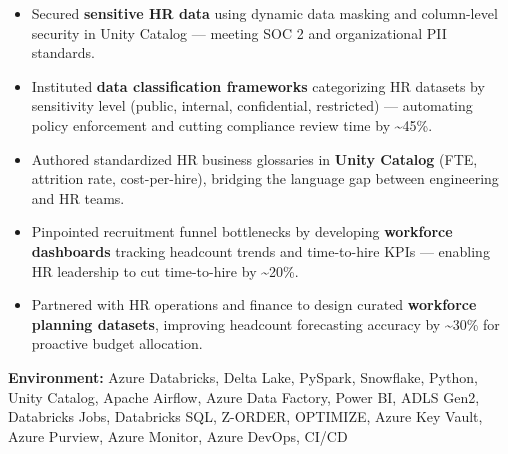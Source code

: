 \documentclass[a4paper,10pt]{article}
\begin{document}
\begin{itemize}
    \item Secured \textbf{sensitive HR data} using dynamic data masking and column-level security in Unity Catalog — meeting SOC 2 and organizational PII standards.
    \item Instituted \textbf{data classification frameworks} categorizing HR datasets by sensitivity level (public, internal, confidential, restricted) — automating policy enforcement and cutting compliance review time by \textasciitilde 45\%.
    \item Authored standardized HR business glossaries in \textbf{Unity Catalog} (FTE, attrition rate, cost-per-hire), bridging the language gap between engineering and HR teams.
    \item Pinpointed recruitment funnel bottlenecks by developing \textbf{workforce dashboards} tracking headcount trends and time-to-hire KPIs — enabling HR leadership to cut time-to-hire by \textasciitilde 20\%.
    \item Partnered with HR operations and finance to design curated \textbf{workforce planning datasets}, improving headcount forecasting accuracy by \textasciitilde 30\% for proactive budget allocation.
\end{itemize}

\textbf{Environment:} Azure Databricks, Delta Lake, PySpark, Snowflake, Python, Unity Catalog, Apache Airflow, Azure Data Factory, Power BI, ADLS Gen2, Databricks Jobs, Databricks SQL, Z-ORDER, OPTIMIZE, Azure Key Vault, Azure Purview, Azure Monitor, Azure DevOps, CI/CD
\end{document}
